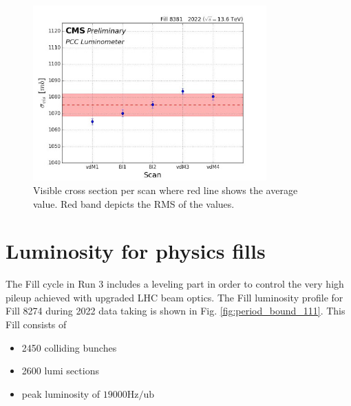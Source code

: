 
\begin{figure}[!htp]
\centering
\includegraphics[width=0.8\textwidth]{ashish_thesis/2022_sigma_vis_per_scan.png}
\caption[2022 PCC Visible Cross Section]{%
  Visible cross section per scan where red line shows the average value. Red band depicts the RMS of the values.
}
\label{fig:period_bound_105}
\end{figure}

\newpage
\section{Luminosity for physics fills}

The Fill cycle in Run 3 includes a leveling part in order to control the very high pileup achieved with upgraded LHC beam optics. The Fill luminosity profile for Fill 8274 during 2022 data taking is shown in Fig. \ref{fig:period_bound_111}. This Fill consists of

\begin{itemize}
  
\item 2450 colliding bunches

\item 2600 lumi sections

\item peak luminosity of $19000 \text{Hz} / \text{ub}$


\end{itemize}

